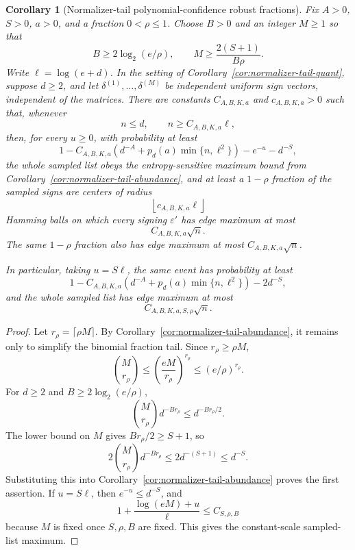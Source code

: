 \documentclass[11pt]{amsart}
\numberwithin{equation}{section}
\newtheorem{corollary}[theorem]{Corollary}
\theoremstyle{definition}
\theoremstyle{remark}
\newcommand{\eps}{\varepsilon}
\begin{document}
\begin{corollary}[Normalizer-tail polynomial-confidence robust fractions]
\label{cor:normalizer-tail-robust-fraction-confidence}
Fix \(A>0\), \(S>0\), \(a>0\), and a fraction \(0<\rho\le1\).  Choose \(B>0\)
and an integer \(M\ge1\) so that
\[
  B\ge 2\log_2(e/\rho),
  \qquad
  M\ge \frac{2(S+1)}{B\rho}.
\]
Write \(\ell=\log(e+d)\).  In the setting of
Corollary~\ref{cor:normalizer-tail-quant}, suppose \(d\ge2\), and let
\(\delta^{(1)},\ldots,\delta^{(M)}\) be independent uniform sign vectors,
independent of the matrices.  There are constants \(C_{A,B,K,a}\) and
\(c_{A,B,K,a}>0\) such that, whenever
\[
  n\le d,\qquad n\ge C_{A,B,K,a}\ell ,
\]
then, for every \(u\ge0\), with probability at least
\[
  1-C_{A,B,K,a}\left(d^{-A}+p_d(a)\min\{n,\ell^2\}\right)
  -e^{-u}-d^{-S},
\]
the whole sampled list obeys the entropy-sensitive maximum bound from
Corollary~\ref{cor:normalizer-tail-abundance}, and at least a \(1-\rho\)
fraction of the sampled signs are centers of radius
\[
  \left\lfloor c_{A,B,K,a}\ell\right\rfloor
\]
Hamming balls on which every signing \(\eps'\) has edge maximum at most
\[
  C_{A,B,K,a}\sqrt n .
\]
The same \(1-\rho\) fraction also has edge maximum at most
\(C_{A,B,K,a}\sqrt n\).

In particular, taking \(u=S\ell\), the same event has probability at least
\[
  1-C_{A,B,K,a}\left(d^{-A}+p_d(a)\min\{n,\ell^2\}\right)-2d^{-S},
\]
and the whole sampled list has edge maximum at most
\[
  C_{A,B,K,a,S,\rho}\sqrt n .
\]
\end{corollary}

\begin{proof}
Let \(r_\rho=\lceil\rho M\rceil\).  By
Corollary~\ref{cor:normalizer-tail-abundance}, it remains only to simplify the
binomial fraction tail.  Since \(r_\rho\ge\rho M\),
\[
  \binom{M}{r_\rho}\le \left(\frac{eM}{r_\rho}\right)^{r_\rho}
  \le (e/\rho)^{r_\rho}.
\]
For \(d\ge2\) and \(B\ge2\log_2(e/\rho)\),
\[
  \binom{M}{r_\rho}d^{-B r_\rho}
  \le d^{-B r_\rho/2}.
\]
The lower bound on \(M\) gives \(B r_\rho/2\ge S+1\), so
\[
  2\binom{M}{r_\rho}d^{-B r_\rho}\le 2d^{-(S+1)}\le d^{-S}.
\]
Substituting this into Corollary~\ref{cor:normalizer-tail-abundance} proves the
first assertion.  If \(u=S\ell\), then \(e^{-u}\le d^{-S}\), and
\[
  1+\frac{\log(eM)+u}{\ell}
  \le C_{S,\rho,B}
\]
because \(M\) is fixed once \(S,\rho,B\) are fixed.  This gives the
constant-scale sampled-list maximum.
\end{proof}
\end{document}
